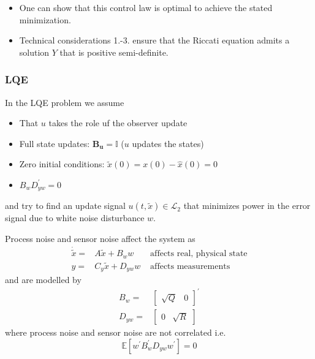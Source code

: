 
\begin{itemize}
    \item One can show that this control law is optimal to achieve the stated minimization.
    \item Technical considerations 1.-3. ensure that the Riccati equation admits a solution $Y$ that is positive semi-definite.
\end{itemize}


\subsubsection{LQE}
In the LQE problem we assume
\begin{itemize}
    \item That $u$ takes the role uf the observer update
    \item Full state updates: $\mathbf{B_u}=\mathbf{\mathbb{I}}$ ($u$ updates the states)
    \item Zero initial conditions: $\tilde{x}(0)=x(0)-\hat{x}(0)=0$
    \item $B_w D_{yw}^{\prime}=0$
\end{itemize}
and try to find an update signal $u(t,\tilde{x})\in \mathcal{L}_2$ that minimizes power in the error signal due to white noise disturbance $w$.


Process noise and sensor noise affect the system as
\begin{align*}
    \dot{\tilde{x}}= & A\tilde{x}+B_{w} w   & \text{ affects real, physical state} \\
    y=               & C_y\tilde{x}+D_{yw}w & \text{ affects measurements}
\end{align*}
and are modelled by
\begin{align*}
    B_w=    & \begin{bmatrix}\sqrt{Q}&0\end{bmatrix}^{\prime} \\
    D_{yw}= & \begin{bmatrix}0&\sqrt{R}\end{bmatrix}
\end{align*}
where process noise and sensor noise are not correlated i.e.
\begin{equation*}
    \mathbb{E}\left[w^\prime B_w^\prime D_{yw}w^\prime\right]=0
\end{equation*}


